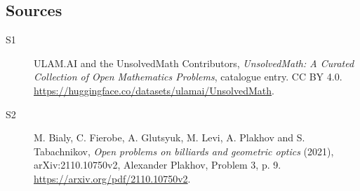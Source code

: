 \documentclass[11pt]{article}
\begin{document}
\subsection{Sources}
\begin{description}
\item[\hypertarget{source:statement:1}{S1}] ULAM.AI and the UnsolvedMath Contributors, \emph{UnsolvedMath: A Curated Collection of Open Mathematics Problems}, catalogue entry. CC BY 4.0. \url{https://huggingface.co/datasets/ulamai/UnsolvedMath}.
\item[\hypertarget{source:statement:2}{S2}] M. Bialy, C. Fierobe, A. Glutsyuk, M. Levi, A. Plakhov and S. Tabachnikov, \emph{Open problems on billiards and geometric optics} (2021), arXiv:2110.10750v2, Alexander Plakhov, Problem 3, p. 9. \url{https://arxiv.org/pdf/2110.10750v2}.
\end{description}
\label{end:statement}
\end{document}

